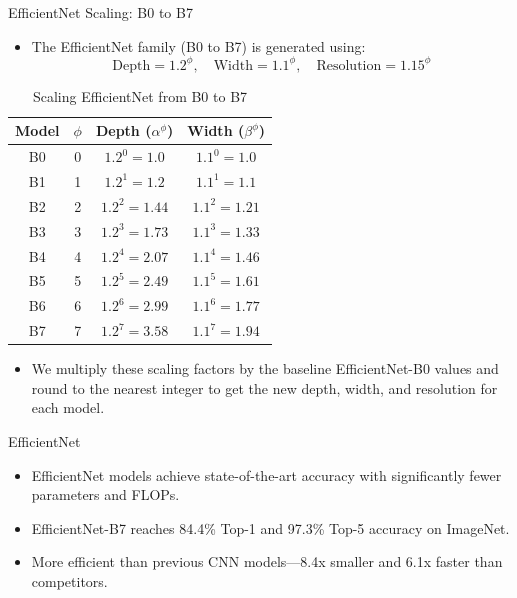 \begin{frame}{EfficientNet Scaling: B0 to B7}
\begin{itemize}
    \item The EfficientNet family (B0 to B7) is generated using:
    \[
    \text{Depth} = 1.2^\phi, \quad
    \text{Width} = 1.1^\phi, \quad
    \text{Resolution} = 1.15^\phi
    \]
\end{itemize}

\begin{table}[]
    \centering
    \begin{tabular}{|c|c|c|c|}
        \hline
        \textbf{Model} & \(\phi\) & \textbf{Depth} (\(\alpha^\phi\)) & \textbf{Width} (\(\beta^\phi\)) \\ 
        \hline
        B0 & 0 & \(1.2^0 = 1.0\) & \(1.1^0 = 1.0\)  \\ 
        B1 & 1 & \(1.2^1 = 1.2\) & \(1.1^1 = 1.1\)  \\ 
        B2 & 2 & \(1.2^2 = 1.44\) & \(1.1^2 = 1.21\)  \\ 
        B3 & 3 & \(1.2^3 = 1.73\) & \(1.1^3 = 1.33\)  \\ 
        B4 & 4 & \(1.2^4 = 2.07\) & \(1.1^4 = 1.46\)  \\ 
        B5 & 5 & \(1.2^5 = 2.49\) & \(1.1^5 = 1.61\)  \\ 
        B6 & 6 & \(1.2^6 = 2.99\) & \(1.1^6 = 1.77\)  \\ 
        B7 & 7 & \(1.2^7 = 3.58\) & \(1.1^7 = 1.94\)  \\ 
        \hline
    \end{tabular}
    \caption{Scaling EfficientNet from B0 to B7}
\end{table}

\begin{itemize}
\item We multiply these scaling factors by the baseline EfficientNet-B0 values and round to the nearest integer to get the new depth, width, and resolution for each model.
\end{itemize}


\end{frame}


\begin{frame}{EfficientNet}

\begin{itemize}
    \item EfficientNet models achieve state-of-the-art accuracy with significantly fewer parameters and FLOPs.        \pause

    \item EfficientNet-B7 reaches 84.4\% Top-1 and 97.3\% Top-5 accuracy on ImageNet.
    \pause

    \item More efficient than previous CNN models---8.4x smaller and 6.1x faster than competitors.
\end{itemize}
\end{frame}


